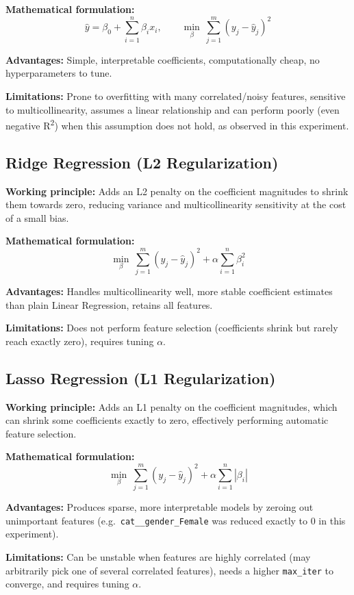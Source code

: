 \documentclass[12pt,a4paper]{article}
\begin{document}
\textbf{Mathematical formulation:}
\[
\hat{y} = \beta_0 + \sum_{i=1}^{n}\beta_i x_i, \qquad
\min_{\beta}\ \sum_{j=1}^{m}\left(y_j - \hat{y}_j\right)^2
\]

\textbf{Advantages:} Simple, interpretable coefficients, computationally cheap, no hyperparameters to tune.

\textbf{Limitations:} Prone to overfitting with many correlated/noisy features, sensitive to multicollinearity, assumes a linear relationship and can perform poorly (even negative R\textsuperscript{2}) when this assumption does not hold, as observed in this experiment.

\subsection*{Ridge Regression (L2 Regularization)}
\textbf{Working principle:} Adds an L2 penalty on the coefficient magnitudes to shrink them towards zero, reducing variance and multicollinearity sensitivity at the cost of a small bias.

\textbf{Mathematical formulation:}
\[
\min_{\beta}\ \sum_{j=1}^{m}\left(y_j - \hat{y}_j\right)^2 + \alpha \sum_{i=1}^{n}\beta_i^2
\]

\textbf{Advantages:} Handles multicollinearity well, more stable coefficient estimates than plain Linear Regression, retains all features.

\textbf{Limitations:} Does not perform feature selection (coefficients shrink but rarely reach exactly zero), requires tuning $\alpha$.

\subsection*{Lasso Regression (L1 Regularization)}
\textbf{Working principle:} Adds an L1 penalty on the coefficient magnitudes, which can shrink some coefficients exactly to zero, effectively performing automatic feature selection.

\textbf{Mathematical formulation:}
\[
\min_{\beta}\ \sum_{j=1}^{m}\left(y_j - \hat{y}_j\right)^2 + \alpha \sum_{i=1}^{n}|\beta_i|
\]

\textbf{Advantages:} Produces sparse, more interpretable models by zeroing out unimportant features (e.g.\ \texttt{cat\_\_gender\_Female} was reduced exactly to 0 in this experiment).

\textbf{Limitations:} Can be unstable when features are highly correlated (may arbitrarily pick one of several correlated features), needs a higher \texttt{max\_iter} to converge, and requires tuning $\alpha$.
\end{document}
